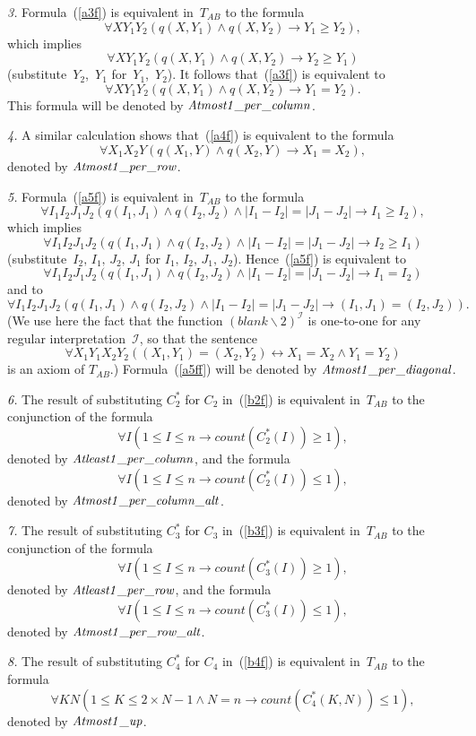 \documentclass[11pt]{article}
\def\bs{\backslash}
\def\lrar{\leftrightarrow}
\def\beq{\begin{equation}}
\def\eeq#1{\label{#1}\end{equation}}
\def\I{\mathcal{I}}
\newcommand{\co}{\ensuremath{\mathit{count}}}
\def\aThreefs{\mathit{Atmost1\_per\_column\/}}
\def\aFourfs{\mathit{Atmost1\_per\_row\/}}
\def\aFivefs{\mathit{Atmost1\_per\_diagonal\/}}
\def\bTwofgeq{\mathit{Atleast1\_per\_column\/}}
\def\bTwofleq{\mathit{Atmost1\_per\_column\_alt\/}}
\def\bThreefgeq{\mathit{Atleast1\_per\_row\/}}
\def\bThreefleq{\mathit{Atmost1\_per\_row\_alt\/}}
\def\bFourfs{\mathit{Atmost1\_up\/}}
\begin{document}
\begin{adjustwidth}{-1cm}{-1cm}
\medskip\noindent\emph{3.}
Formula~(\ref{a3f}) is equivalent in~$T_{AB}$ to the formula
$$\forall XY_1Y_2(q(X,Y_1) \land q(X,Y_2) \to Y_1 \geq Y_2),$$
which implies
$$\forall XY_1Y_2(q(X,Y_1) \land q(X,Y_2) \to Y_2 \geq Y_1)$$
(substitute~$Y_2$,~$Y_1$ for~$Y_1$,~$Y_2$). It follows that~(\ref{a3f}) is
equivalent to
$$
\forall XY_1Y_2(q(X,Y_1) \land q(X,Y_2) \to Y_1 = Y_2).
$$
This formula will be denoted by $\aThreefs$.

\medskip\noindent\emph{4.}
A similar calculation shows that~(\ref{a4f})
is equivalent to the formula
$$\forall X_1X_2Y(q(X_1,Y) \land q(X_2,Y) \to X_1 = X_2),$$
denoted by $\aFourfs$.

\medskip\noindent\emph{5.}
Formula~(\ref{a5f})
is equivalent in~$T_{AB}$ to the formula
$$\forall I_1I_2J_1J_2
(q(I_1,J_1) \land q(I_2,J_2) \land |I_1-I_2|=|J_1-J_2| \to I_1 \geq I_2),$$
which implies
$$\forall I_1I_2J_1J_2
(q(I_1,J_1) \land q(I_2,J_2) \land |I_1-I_2|=|J_1-J_2| \to I_2 \geq I_1)
$$
(substitute~$I_2,\,I_1,\,J_2,\,J_1$ for $I_1,\,I_2,\,J_1,\,J_2$).
Hence~(\ref{a5f}) is equivalent to
$$
\forall I_1I_2J_1J_2
(q(I_1,J_1) \land q(I_2,J_2) \land |I_1-I_2|=|J_1-J_2|\to I_1= I_2)
$$
and to
\beq
\forall I_1I_2J_1J_2
(q(I_1,J_1)\land q(I_2,J_2) \land |I_1-I_2|=|J_1-J_2|
\to (I_1,J_1) = (I_2,J_2)).
\eeq{a5ff}
(We use here the fact that the function $(\mathit{blank}\bs 2)^\I$ is
one-to-one for any regular interpretation~$\I$, so that the sentence
$$\forall X_1Y_1X_2Y_2((X_1,Y_1)=(X_2,Y_2) \lrar X_1=X_2 \land Y_1=Y_2)$$
is an axiom of $T_{AB}$.)
Formula~(\ref{a5ff}) will be denoted by $\aFivefs$.

\medskip\noindent\emph{6.}
The result of substituting $C_2^*$ for $C_2$ in~(\ref{b2f}) is equivalent
in~$T_{AB}$ to
the conjunction of the formula
$$
\forall I(1\leq I\leq n \to \co(C^*_2(I)) \geq 1),
$$
denoted by $\bTwofgeq$, and the formula
$$
\forall I(1\leq I\leq n \to \co(C^*_2(I))\leq 1),
$$
denoted by $\bTwofleq$.

\medskip\noindent\emph{7.}
The result of substituting $C_3^*$ for $C_3$ in~(\ref{b3f}) is equivalent
in~$T_{AB}$ to
the conjunction of the formula
$$
\forall I(1\leq I\leq n \to \co(C^*_3(I)) \geq 1),
$$
denoted by $\bThreefgeq$, and the formula
$$
\forall I(1\leq I\leq n \to \co(C^*_3(I))\leq 1),
$$
denoted by $\bThreefleq$.

\medskip\noindent\emph{8.}
The result of substituting $C_4^*$ for $C_4$ in~(\ref{b4f}) is equivalent
in~$T_{AB}$ to the formula
$$
\forall KN(1\leq K\leq 2\times N-1  \land N=n \to \co(C^*_4(K,N))\leq 1),
$$
denoted by $\bFourfs$.


\end{adjustwidth}
\end{document}
